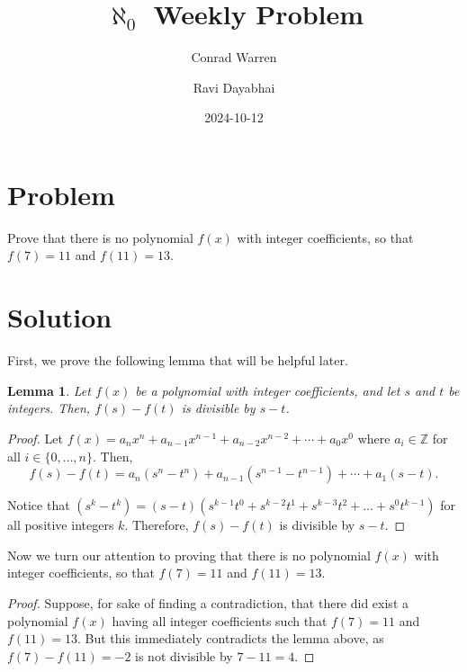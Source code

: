 \documentclass{article}
\title{$\aleph_{0}$ Weekly Problem}
\author{Conrad Warren \and Ravi Dayabhai}
\date{2024-10-12}
\newtheorem*{lemma}{Lemma}
\begin{document}
\maketitle

\section*{Problem}

Prove that there is no polynomial $f(x)$ with integer coefficients, so that $f(7)=11$ and $f(11)=13$.

\section*{Solution}

First, we prove the following lemma that will be helpful later.

\begin{lemma}
    Let $f(x)$ be a polynomial with integer coefficients, and let $s$ and $t$ be integers. Then, $f(s) - f(t)$ is divisible by $s - t$.
\end{lemma}

\begin{proof}

    Let \(f(x) = a_{n}x^n + a_{n-1}x^{n-1} + a_{n-2}x^{n-2} + \cdots + a_{0}x^{0}\) where $a_i \in \mathbb{Z}$ for all $i \in \lbrace 0, \ldots, n \rbrace$.
    Then,
        \[f(s) - f(t) = a_{n}(s^n - t^n) + a_{n-1}(s^{n-1}-t^{n-1}) + \cdots + a_{1}(s - t)\text{.}\]     

    Notice that \((s^k - t^k) = (s - t)(s^{k-1}t^{0} + s^{k-2}t^{1} + s^{k-3}t^{2} + \ldots + s^{0}t^{k-1})\) for all positive integers \(k\). Therefore, $f(s) - f(t)$ is divisible by $s - t$. 

\end{proof}

Now we turn our attention to proving that there is no polynomial $f(x)$ with integer coefficients, so that $f(7)=11$ and $f(11)=13$.

\begin{proof}

    Suppose, for sake of finding a contradiction, that there did exist a polynomial $f(x)$ having all integer coefficients such that $f(7)=11$ and $f(11)=13$. But this immediately contradicts the lemma above, as $f(7) - f(11) = -2$ is not divisible by $7 - 11 = 4$.

\end{proof}
\end{document}
